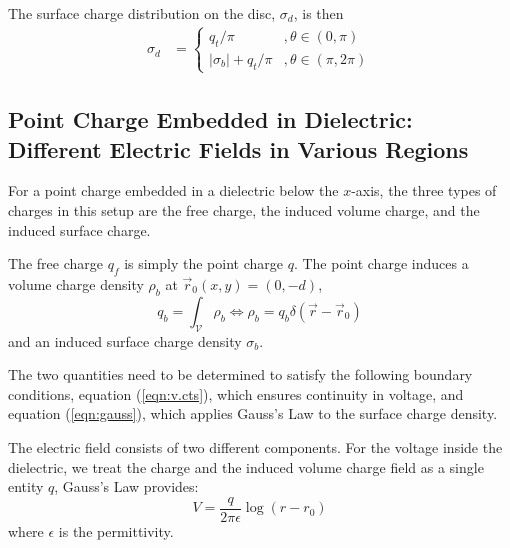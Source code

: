 The surface charge distribution on the disc, $\sigma_d$, is then
\begin{align*}
\sigma_d&= \begin{cases}q_t/\pi &, \theta\in(0,\pi) \\
|\sigma_b| + q_t/\pi &,  \theta\in(\pi,2\pi)\end{cases}
\end{align*}

\subsection{Point Charge Embedded in Dielectric: Different Electric Fields in Various Regions}\label{cpt:charge in die}
\hspace{0em}\indent For a point charge embedded in a dielectric below the $x$-axis, the three types of charges in this setup are the free charge, the induced volume charge, and the induced surface charge.

The free charge $q_f$ is simply the point charge $q$. The point charge induces a volume charge density $\rho_b$ at $\vec{r}_0(x,y) = (0, -d)$, \[q_b=\int_\mathcal{V}\rho_b\Longleftrightarrow \rho_b = q_b\delta(\vec{r}-\vec{r}_0)
\]
and an induced surface charge density $\sigma_b$.

The two quantities need to be determined to satisfy the following boundary conditions, equation (\ref{eqn:v.cts}), which ensures continuity in voltage, and equation (\ref{eqn:gauss}), which applies Gauss's Law to the surface charge density.

The electric field consists of two different components. For the voltage inside the dielectric, we treat the charge and the induced volume charge field as a single entity $q$, Gauss's Law provides:
\[
V = \frac{q}{2\pi\epsilon} \log(r - r_0)
\]
where $\epsilon$ is the permittivity.

